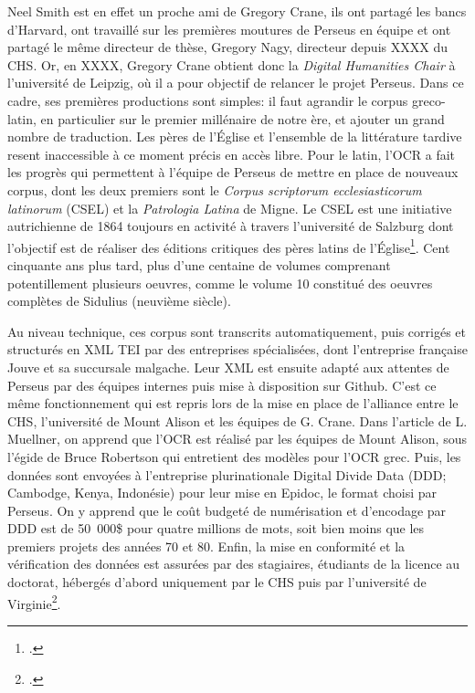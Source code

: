 Neel Smith est en effet un proche ami de Gregory Crane, ils ont partagé les bancs d'Harvard, ont travaillé sur les premières moutures de Perseus en équipe et ont partagé le même directeur de thèse, Gregory Nagy, directeur depuis XXXX du CHS. Or, en XXXX, Gregory Crane obtient donc la \textit{Digital Humanities Chair} à l'université de Leipzig, où il a pour objectif de relancer le projet Perseus. Dans ce cadre, ses premières productions sont simples: il faut agrandir le corpus greco-latin, en particulier sur le premier millénaire de notre ère, et ajouter un grand nombre de traduction. Les pères de l'Église et l'ensemble de la littérature tardive resent inaccessible à ce moment précis en accès libre. Pour le latin, l'OCR a fait les progrès qui permettent à l'équipe de Perseus de mettre en place de nouveaux corpus, dont les deux premiers sont le \textit{Corpus scriptorum ecclesiasticorum latinorum} (CSEL) et la \textit{Patrologia Latina} de Migne. Le CSEL est une initiative autrichienne de 1864 toujours en activité à travers l'université de Salzburg dont l'objectif est de réaliser des éditions critiques des pères latins de l'Église\footcite{noauthor_history_nodate}. Cent cinquante ans plus tard, plus d'une centaine de volumes comprenant potentillement plusieurs oeuvres, comme le volume 10 constitué des oeuvres complètes de Sidulius (neuvième siècle).

Au niveau technique, ces corpus sont transcrits automatiquement, puis corrigés et structurés en XML TEI par des entreprises spécialisées, dont l'entreprise française Jouve et sa succursale malgache. Leur XML est ensuite adapté aux attentes de Perseus par des équipes internes puis mise à disposition sur Github. C'est ce même fonctionnement qui est repris lors de la mise en place de l'alliance entre le CHS, l'université de Mount Alison et les équipes de G. Crane. Dans l'article de L. Muellner, on apprend que l'OCR est réalisé par les équipes de Mount Alison, sous l'égide de Bruce Robertson qui entretient des modèles pour l'OCR grec. Puis, les données sont envoyées à l'entreprise plurinationale Digital Divide Data (DDD; Cambodge, Kenya, Indonésie) pour leur mise en Epidoc, le format choisi par Perseus. On y apprend que le coût budgeté de numérisation et d'encodage par DDD est de 50~000\$ pour quatre millions de mots, soit bien moins que les premiers projets des années 70 et 80. Enfin, la mise en conformité et la vérification des données est assurées par des stagiaires, étudiants de la licence au doctorat, hébergés d'abord uniquement par le CHS puis par l'université de Virginie\footcite{robertson2019optical}.

